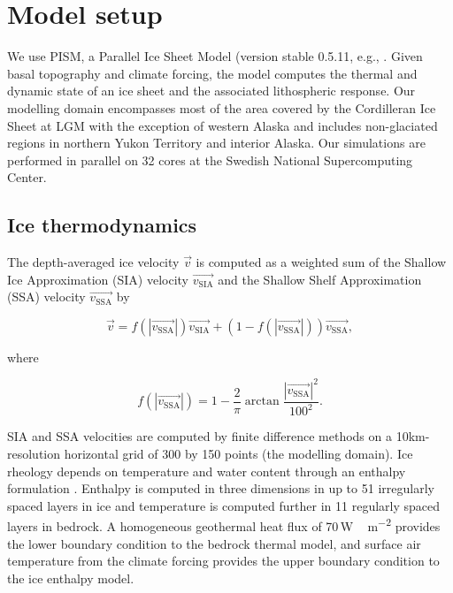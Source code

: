 \section{Model setup}
\label{sec:model}

We use PISM, a Parallel Ice Sheet Model (version stable 0.5.11, e.g., \citet{bueler-brown-2009,winkelmann-etal-2011,aschwanden-etal-2012,web:pism}. Given basal topography and climate forcing, the model computes the thermal and dynamic state of an ice sheet and the associated lithospheric response. Our modelling domain encompasses most of the area covered by the Cordilleran Ice Sheet at LGM with the exception of western Alaska and includes non-glaciated regions in northern Yukon Territory and interior Alaska. Our simulations are performed in parallel on 32 cores at the Swedish National Supercomputing Center.

\subsection{Ice thermodynamics}

The depth-averaged ice velocity $\vec{v}$ is computed as a weighted sum of the Shallow Ice Approximation (SIA) velocity $\vec{v_{\mathrm{SIA}}}$ and the Shallow Shelf Approximation (SSA) velocity $\vec{v_{\mathrm{SSA}}}$ \citep{bueler-brown-2009} by

\begin{equation}
	\vec{v} = f(|\vec{v_{\mathrm{SSA}}}|)\vec{v_{\mathrm{SIA}}}
  + (1-f(|\vec{v_{\mathrm{SSA}}}|))\vec{v_{\mathrm{SSA}}},
\end{equation}

where

\begin{equation}
	f(|\vec{v_{\mathrm{SSA}}}|) = 1
	- \frac{2}{\pi}\arctan{\frac{|\vec{v_{\mathrm{SSA}}}|^2}{100^2}}.
\end{equation}

SIA and SSA velocities are computed by finite difference methods on a 10km-resolution horizontal grid of 300 by 150 points (the modelling domain). Ice rheology depends on temperature and water content through an enthalpy formulation \citep{aschwanden-blatter-2009,aschwanden-etal-2012}. Enthalpy is computed in three dimensions in up to 51 irregularly spaced layers in ice and temperature is computed further in 11 regularly spaced layers in bedrock. A homogeneous geothermal heat flux of 70\,\unit{W\,m^{-2}} provides the lower boundary condition to the bedrock thermal model, and surface air temperature from the climate forcing provides the upper boundary condition to the ice enthalpy model.


